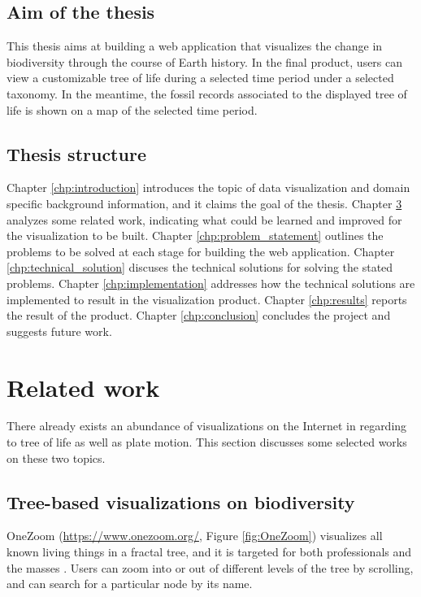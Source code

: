 \documentclass[11pt, a4paper,oneside,chapterprefix=false]{scrbook}
\begin{document}
\section{Aim of the thesis}
This thesis aims at building a web application that visualizes the change in biodiversity through the course of Earth history. In the final product, users can view a customizable tree of life during a selected time period under a selected taxonomy. In the meantime, the fossil records associated to the displayed tree of life is shown on a map of the selected time period. 

\section{Thesis structure}
Chapter \ref{chp:introduction} introduces the topic of data visualization and domain specific background information, and it claims the goal of the thesis. Chapter \ref{chp:related_work} analyzes some related work, indicating what could be learned and improved for the visualization to be built. Chapter \ref{chp:problem_statement} outlines the problems to be solved at each stage for building the web application. Chapter \ref{chp:technical_solution} discuses the technical solutions for solving the stated problems. Chapter \ref{chp:implementation} addresses how the technical solutions are implemented to result in the visualization product. Chapter \ref{chp:results} reports the result of the product. Chapter \ref{chp:conclusion} concludes the project and suggests future work.


\chapter{Related work} \label{chp:related_work}

There already exists an abundance of visualizations on the Internet in regarding to tree of life as well as plate motion. This section discusses some selected works on these two topics. 

\section{Tree-based visualizations on biodiversity}
OneZoom (\url{https://www.onezoom.org/}, Figure \ref{fig:OneZoom}) visualizes all known living things in a fractal tree, and it is targeted for both professionals and the masses \cite{rosindell2012onezoom}. Users can zoom into or out of different levels of the tree by scrolling, and can search for a particular node by its name. 
\end{document}
